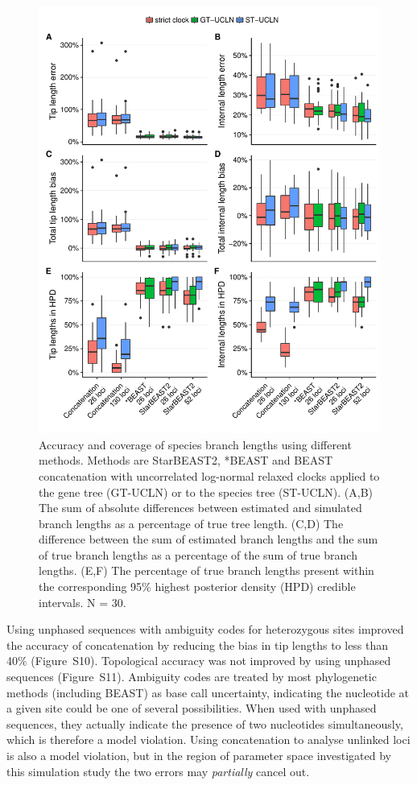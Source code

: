 \documentclass[12pt]{article}
\begin{document}
\begin{figure}[htb!]
\centering
\includegraphics[width=130mm]{branch_length_accuracy_phased.pdf}
\caption
{Accuracy and coverage of species branch lengths using different methods. Methods are StarBEAST2,
*BEAST and BEAST concatenation with uncorrelated log-normal relaxed clocks applied
to the gene tree (GT-UCLN) or to the species tree (ST-UCLN). (A,B) The sum of absolute
differences between estimated and simulated branch lengths as a percentage of true
tree length. (C,D) The difference between the sum of estimated branch lengths and the
sum of true branch lengths as a percentage of the sum of true branch lengths. (E,F) The
percentage of true branch lengths present within the corresponding 95\% highest posterior density (HPD)
credible intervals. N = 30.}
\label{fig:branchLengthsError}
\end{figure}

Using unphased sequences with ambiguity codes for heterozygous sites improved
the accuracy of concatenation by reducing the bias in tip lengths to less than
40\% (Figure~S10). Topological accuracy was not improved by using unphased
sequences (Figure~S11). Ambiguity codes are treated by most
phylogenetic methods (including BEAST) as base call uncertainty,
indicating the nucleotide at a given site could be one of several
possibilities. When used with unphased sequences, they actually indicate the
presence of two nucleotides simultaneously, which is therefore a model violation.
Using concatenation to analyse unlinked loci is also a model violation, but in
the region of parameter space investigated by this simulation study the two
errors may \textit{partially} cancel out.
\end{document}
